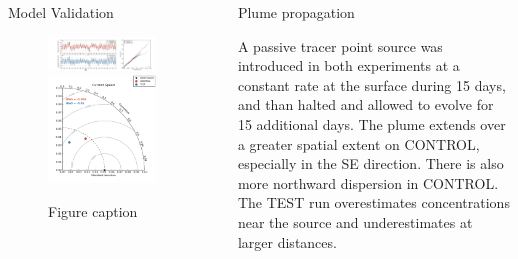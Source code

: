 \documentclass[final]{beamer}
\newlength{\sepwid}
\newlength{\onecolwid}
\newlength{\twocolwid}
\begin{document}
\begin{frame}[t]
\begin{columns}[t]
\begin{column}{\twocolwid}
\begin{columns}[t,totalwidth=\twocolwid]
\begin{column}{\onecolwid}
\begin{block}
            \end{block}


        \end{column} %

    \end{columns} %

    \begin{block}{Model Validation}

    \begin{figure}
    \includegraphics[width=0.76\linewidth]{validation.png}
    \includegraphics[width=0.24\linewidth]{taylor.png}
    \caption{\label{validation} Figure caption}
    \end{figure}

    \end{block}


\end{column} %

\begin{column}{\sepwid}\end{column} %

\begin{column}{\onecolwid} %

    \begin{block}{Plume propagation}

    A passive tracer point source was introduced in both experiments at a constant rate at the surface during 15 days, and than halted and allowed to evolve for 15 additional days. The plume extends over a greater spatial extent on CONTROL, especially in the SE direction. There is also more northward dispersion in CONTROL. The TEST run overestimates concentrations near the source and underestimates at larger distances. 


\end{block}
\end{column}
\end{columns}
\end{frame}
\end{document}
